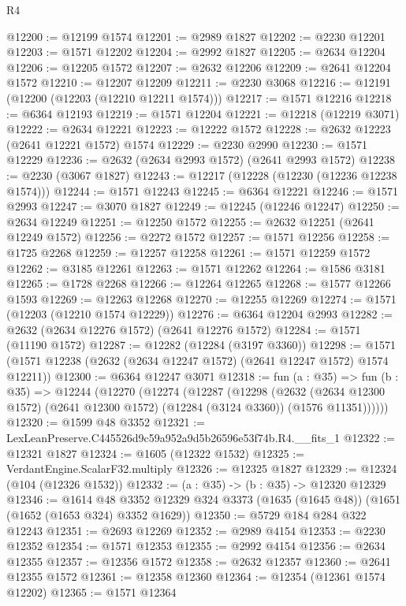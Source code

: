 \begin{lexlean}{R4}
\begin{coremodule}
@12200 := @12199 @1574
@12201 := @2989 @1827
@12202 := @2230 @12201
@12203 := @1571 @12202
@12204 := @2992 @1827
@12205 := @2634 @12204
@12206 := @12205 @1572
@12207 := @2632 @12206
@12209 := @2641 @12204 @1572
@12210 := @12207 @12209
@12211 := @2230 @3068
@12216 := @12191 (@12200 (@12203 (@12210 @12211 @1574)))
@12217 := @1571 @12216
@12218 := @6364 @12193
@12219 := @1571 @12204
@12221 := @12218 (@12219 @3071)
@12222 := @2634 @12221
@12223 := @12222 @1572
@12228 := @2632 @12223 (@2641 @12221 @1572) @1574
@12229 := @2230 @2990
@12230 := @1571 @12229
@12236 := @2632 (@2634 @2993 @1572) (@2641 @2993 @1572)
@12238 := @2230 (@3067 @1827)
@12243 := @12217 (@12228 (@12230 (@12236 @12238 @1574)))
@12244 := @1571 @12243
@12245 := @6364 @12221
@12246 := @1571 @2993
@12247 := @3070 @1827
@12249 := @12245 (@12246 @12247)
@12250 := @2634 @12249
@12251 := @12250 @1572
@12255 := @2632 @12251 (@2641 @12249 @1572)
@12256 := @2272 @1572
@12257 := @1571 @12256
@12258 := @1725 @2268
@12259 := @12257 @12258
@12261 := @1571 @12259 @1572
@12262 := @3185 @12261
@12263 := @1571 @12262
@12264 := @1586 @3181
@12265 := @1728 @2268
@12266 := @12264 @12265
@12268 := @1577 @12266 @1593
@12269 := @12263 @12268
@12270 := @12255 @12269
@12274 := @1571 (@12203 (@12210 @1574 @12229))
@12276 := @6364 @12204 @2993
@12282 := @2632 (@2634 @12276 @1572) (@2641 @12276 @1572)
@12284 := @1571 (@11190 @1572)
@12287 := @12282 (@12284 (@3197 @3360))
@12298 := @1571 (@1571 @12238 (@2632 (@2634 @12247 @1572) (@2641 @12247 @1572) @1574 @12211))
@12300 := @6364 @12247 @3071
@12318 := fun (a : @35) =>
  fun (b : @35) =>
  @12244
    (@12270
      (@12274
        (@12287
          (@12298
            (@2632
              (@2634 @12300 @1572)
              (@2641 @12300 @1572)
              (@12284 (@3124 @3360))
              (@1576 @11351))))))
@12320 := @1599 @48 @3352
@12321 := LexLeanPreserve.C445526d9c59a952a9d5b26596e53f74b.R4.__fits_1
@12322 := @12321 @1827
@12324 := @1605 (@12322 @1532)
@12325 := VerdantEngine.ScalarF32.multiply
@12326 := @12325 @1827
@12329 := @12324 (@104 (@12326 @1532))
@12332 := (a : @35) -> (b : @35) -> @12320 @12329
@12346 := @1614
    @48
    @3352
    @12329
    @324
    @3373
    (@1635 (@1645 @48))
    (@1651 (@1652 (@1653 @324) @3352 @1629))
@12350 := @5729 @184 @284 @322 @12243
@12351 := @2693 @12269
@12352 := @2989 @4154
@12353 := @2230 @12352
@12354 := @1571 @12353
@12355 := @2992 @4154
@12356 := @2634 @12355
@12357 := @12356 @1572
@12358 := @2632 @12357
@12360 := @2641 @12355 @1572
@12361 := @12358 @12360
@12364 := @12354 (@12361 @1574 @12202)
@12365 := @1571 @12364

\end{coremodule}
\end{lexlean}
